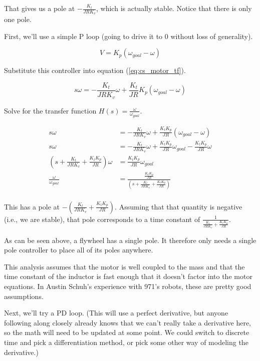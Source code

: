 That gives us a pole at $-\frac{K_t}{JRK_v}$, which is actually stable. Notice
that there is only one pole.

First, we'll use a simple P loop (going to drive it to 0 without loss of
generality).

\begin{equation*}
  V = K_p (\omega_{goal} - \omega)
\end{equation*}

Substitute this controller into equation (\ref{eq:cs_motor_tf}).

\begin{equation*}
  s \omega = -\frac{K_t}{JRK_v} \omega + \frac{K_t}{JR} K_p (\omega_{goal} -
    \omega)
\end{equation*}

Solve for the transfer function $H(s) = \frac{\omega}{\omega_{goal}}$.

\begin{align*}
  s \omega &= -\frac{K_t}{JRK_v} \omega + \frac{K_t K_p}{JR} (\omega_{goal} -
    \omega) \\
  s \omega &= -\frac{K_t}{JRK_v} \omega + \frac{K_t K_p}{JR} \omega_{goal} -
    \frac{K_t K_p}{JR} \omega \\
  \left(s + \frac{K_t}{JRK_v} + \frac{K_t K_p}{JR}\right) \omega &=
    \frac{K_t K_p}{JR} \omega_{goal} \\
  \frac{\omega}{\omega_{goal}} &= \frac{\frac{K_t K_p}{JR}}
    {\left(s + \frac{K_t}{JRK_v} + \frac{K_t K_p}{JR}\right)} \\
\end{align*}

This has a pole at $-\left(\frac{K_t}{JRK_v} + \frac{K_t K_p}{JR}\right)$.
Assuming that that quantity is negative (i.e., we are stable), that pole
corresponds to a time constant of
$\frac{1}{\frac{K_t}{JRK_v} + \frac{K_t K_p}{JR}}$.

As can be seen above, a flywheel has a single pole. It therefore only needs a
single pole controller to place all of its poles anywhere.

\begin{remark}
  This analysis assumes that the motor is well coupled to the mass and that the
  time constant of the inductor is fast enough that it doesn't factor into the
  motor equations. In Austin Schuh's experience with 971's robots, these are
  pretty good assumptions.
\end{remark}

Next, we'll try a PD loop. (This will use a perfect derivative, but anyone
following along closely already knows that we can't really take a derivative
here, so the math will need to be updated at some point. We could switch to
discrete time and pick a differentiation method, or pick some other way of
modeling the derivative.)

